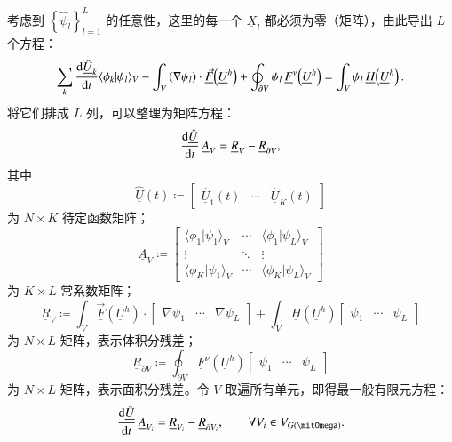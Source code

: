 考虑到 $\left\{ \hat{\psi}_{l}\right\} _{l=1}^{L}$ 的任意性，这里的每一个 $\underline{X}_{l}$
都必须为零（矩阵），由此导出 $L$ 个方程：
\begin{equation}
\sum_{k}\dv{\underline{\hat{U}}_{k}}{t}\langle\phi_{k}\vert\psi_{l}\rangle_{V}-\int_{V}\left(\nabla\psi_{l}\right)\cdot\mathopen{\underline{\vec{F}}}\left(\underline{U}^{h}\right)+\oint_{\partial V}\psi_{l}\,\mathopen{\underline{F}^{\nu}}\left(\underline{U}^{h}\right)=\int_{V}\psi_{l}\,\mathopen{\underline{H}}\left(\underline{U}^{h}\right).
\end{equation}
将它们排成 $L$ 列，可以整理为矩阵方程：
\begin{equation}
\dv{\underline{\hat{U}}}{t}\,\underline{A}_{V}=\underline{R}_{V}-\underline{R}_{\partial V},
\end{equation}
其中
\begin{equation}
\underline{\hat{U}}(t)\coloneqq\begin{bmatrix}\underline{\hat{U}}_{1}(t) & \cdots & \underline{\hat{U}}_{K}(t)\end{bmatrix}
\end{equation}
为 $N\times K$ 待定函数矩阵；
\begin{equation}
\underline{A}_{V}\coloneqq\begin{bmatrix}\langle\phi_{1}\vert\psi_{1}\rangle_{V} & \cdots & \langle\phi_{1}\vert\psi_{L}\rangle_{V}\\
\vdots & \ddots & \vdots\\
\langle\phi_{K}\vert\psi_{1}\rangle_{V} & \cdots & \langle\phi_{K}\vert\psi_{L}\rangle_{V}
\end{bmatrix}\label{eq:coeff_matrix}
\end{equation}
为 $K\times L$ 常系数矩阵；
\begin{equation}
\underline{R}_{V}\coloneqq\int_{V}\mathopen{\underline{\vec{F}}}\left(\underline{U}^{h}\right)\cdot\begin{bmatrix}\nabla\psi_{1} & \cdots & \nabla\psi_{L}\end{bmatrix}+\int_{V}\mathopen{\underline{H}}\left(\underline{U}^{h}\right)\begin{bmatrix}\psi_{1} & \cdots & \psi_{L}\end{bmatrix}
\end{equation}
为 $N\times L$ 矩阵，表示体积分残差；
\begin{equation}
\underline{R}_{\partial V}\coloneqq\oint_{\partial V}\mathopen{\underline{F}^{\nu}}\left(\underline{U}^{h}\right)\begin{bmatrix}\psi_{1} & \cdots & \psi_{L}\end{bmatrix}
\end{equation}
为 $N\times L$ 矩阵，表示面积分残差。令
$V$ 取遍所有单元，即得最一般有限元方程：
\begin{equation}
\dv{\underline{\hat{U}}}{t}\,\underline{A}_{V_{i}}=\underline{R}_{V_{i}}-\underline{R}_{\partial V_{i}},\qquad\forall V_{i}\in V_{G(\varOmega)}.\label{eq:FEM}
\end{equation}


